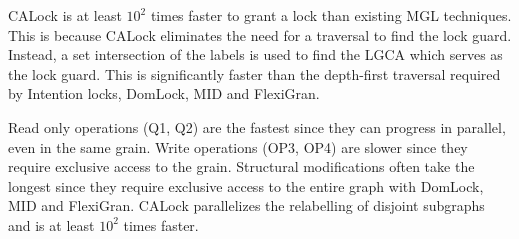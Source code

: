 CALock is at least $10^2$ times faster to grant a lock than existing MGL techniques. This is because CALock eliminates the need for a traversal to find the lock guard. Instead, a set intersection of the labels is used to find the LGCA which serves as the lock guard. This is significantly faster than the depth-first traversal required by Intention locks, DomLock, MID and FlexiGran.

Read only operations (Q1, Q2) are the fastest since they can progress in parallel, even in the same grain. 
Write operations (OP3, OP4) are slower since they require exclusive access to the grain. Structural modifications often take the longest since they require exclusive access to the entire graph with DomLock, MID and FlexiGran. CALock parallelizes the relabelling of disjoint subgraphs and is at least $10^2$ times faster. 







